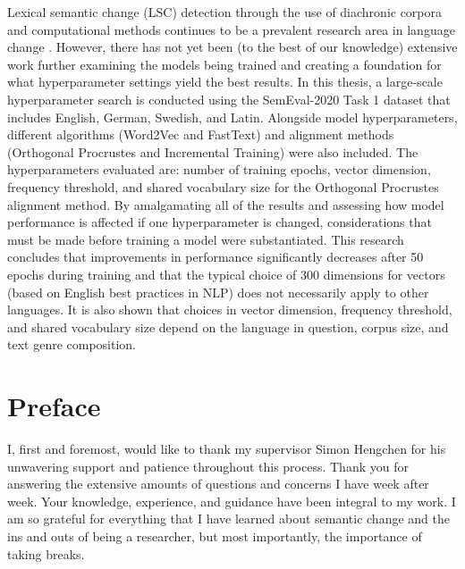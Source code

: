\documentclass[11pt, a4paper]{article}
\begin{document}
Lexical semantic change (LSC) detection through the use of diachronic corpora and computational methods continues to be a prevalent research area in language change \citep{tahmasebi-survey2018}. However, there has not yet been (to the best of our knowledge) extensive work further examining the models being trained and creating a foundation for what hyperparameter settings yield the best results. In this thesis, a large-scale hyperparameter search is conducted using the SemEval-2020 Task 1 dataset that includes English, German, Swedish, and Latin. Alongside model hyperparameters, different algorithms (Word2Vec and FastText) and alignment methods (Orthogonal Procrustes and Incremental Training) were also included. The hyperparameters evaluated are: number of training epochs, vector dimension, frequency threshold, and shared vocabulary size for the Orthogonal Procrustes alignment method. By amalgamating all of the results and assessing how model performance is affected if one hyperparameter is changed, considerations that must be made before training a model were substantiated. This research concludes that improvements in performance significantly decreases after 50 epochs during training and that the typical choice of 300 dimensions for vectors (based on English best practices in NLP) does not necessarily apply to other languages. It is also shown that choices in vector dimension, frequency threshold, and shared vocabulary size depend on the language in question, corpus size, and text genre composition. 



\thispagestyle{empty}

\newpage
\section*{Preface}

I, first and foremost, would like to thank my supervisor Simon Hengchen for his unwavering support and patience throughout this process. Thank you for answering the extensive amounts of questions and concerns I have week after week. Your knowledge, experience, and guidance have been integral to my work. I am so grateful for everything that I have learned about semantic change and the ins and outs of being a researcher, but most importantly, the importance of taking breaks. 
\end{document}
